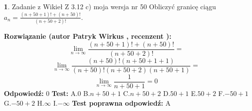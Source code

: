 \documentclass[12pt, a4paper]{article}
\theoremstyle{definition} %
\newtheorem{zad}{}
\newcommand{\zadStart}[1]{\begin{zad}#1\newline}
\newcommand{\zadStop}{\end{zad}}
\newcommand{\rozwStart}[2]{\noindent \textbf{Rozwiązanie (autor #1 , recenzent #2): }\newline}
\newcommand{\rozwStop}{\newline}
\newcommand{\odpStart}{\noindent \textbf{Odpowiedź:}\newline}
\newcommand{\odpStop}{\newline}
\newcommand{\testStart}{\noindent \textbf{Test:}\newline}
\newcommand{\testStop}{\newline}
\newcommand{\kluczStart}{\noindent \textbf{Test poprawna odpowiedź:}\newline}
\newcommand{\kluczStop}{\newline}
\begin{document}
\zadStart{Zadanie z Wikieł Z 3.12 c) moja wersja nr 50}
Obliczyć granicę ciągu $a_{n}=\frac{(n+50+1)!+(n+50)!}{(n+50+2)!}$.
\zadStop
\rozwStart{Patryk Wirkus}{}
$$\lim\limits_{n\to\infty}\frac{(n+50+1)!+(n+50)!}{(n+50+2)!}=$$
$$\lim\limits_{n\to\infty}\frac{(n+50)!(n+50+1+1)}{(n+50)!(n+50+2)(n+50+1)}=$$
$$\lim\limits_{n\to\infty}\frac{1}{n+50+1}= 0$$
\rozwStop
\odpStart
$0$
\odpStop
\testStart
A.$0$
B.$n+50+1$
C.$n+50+2$
D.$50+1$
E.$50+2$
F.$-50+1$
G.$-50+2$
H.$\infty$
I.$-\infty$
\testStop
\kluczStart
A
\kluczStop
\end{document}
